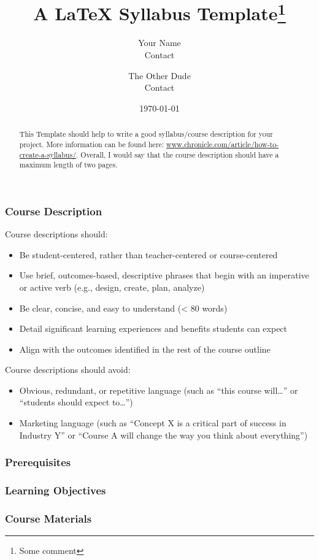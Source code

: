 \documentclass{article}
\title{A \LaTeX{} Syllabus Template\thanks{Some comment}}
\author{Your Name  \\
	Contact  \\
	\and 
	The Other Dude \\
	Contact \\
}
\date{\today}
\begin{document}
	\maketitle
	
\begin{abstract}
	This Template should help to write a good syllabus/course description for your project. More information can be found here: \url{www.chronicle.com/article/how-to-create-a-syllabus/}.
	Overall, I would say that the course description should have a maximum length of two pages.	
\end{abstract}
	
\subsubsection*{Course Description}
	Course descriptions should:
\begin{itemize}
	\item Be student-centered, rather than teacher-centered or course-centered
	\item Use brief, outcomes-based, descriptive phrases that begin with an imperative or active verb (e.g., design, create, plan, analyze)
	\item Be clear, concise, and easy to understand (< 80 words)
	\item Detail significant learning experiences and benefits students can expect
	\item Align with the outcomes identified in the rest of the course outline
\end{itemize}	
	Course descriptions should avoid:
\begin{itemize}
	\item Obvious, redundant, or repetitive language (such as “this course will…” or “students should expect to…”)
	\item Marketing language (such as ``Concept X is a critical part of success in Industry Y'' or ``Course A will change the way you think about everything'')
\end{itemize}
	
\subsubsection*{Prerequisites}
\subsubsection*{Learning Objectives}
\subsubsection*{Course Materials}
\end{document}
